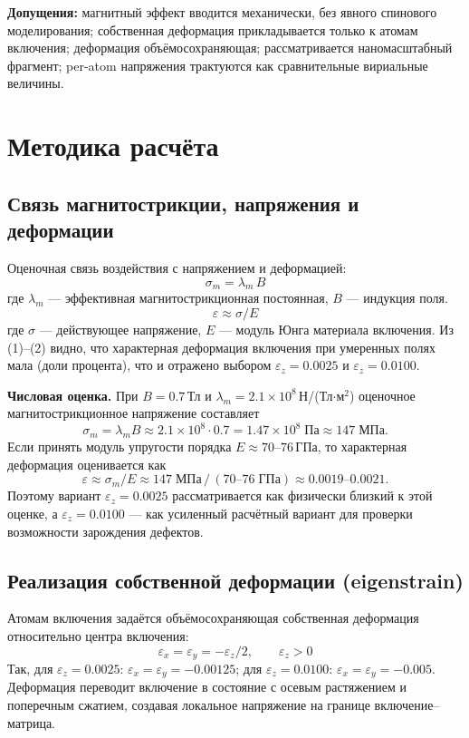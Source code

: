 \documentclass[14pt,a4paper]{extarticle}
\begin{document}
\textbf{Допущения:} магнитный эффект вводится механически, без явного спинового моделирования; собственная деформация прикладывается только к атомам включения; деформация объёмосохраняющая; рассматривается наномасштабный фрагмент; per-atom напряжения трактуются как сравнительные вириальные величины.

\section{Методика расчёта}
\subsection{Связь магнитострикции, напряжения и деформации}
Оценочная связь воздействия с напряжением и деформацией:
\begin{equation}
\sigma_m = \lambda_m \, B
\end{equation}
где $\lambda_m$ — эффективная магнитострикционная постоянная, $B$ — индукция поля.
\begin{equation}
\varepsilon \approx \sigma / E
\end{equation}
где $\sigma$ — действующее напряжение, $E$ — модуль Юнга материала включения. Из (1)–(2) видно, что характерная деформация включения при умеренных полях мала (доли процента), что и отражено выбором $\varepsilon_z = 0.0025$ и $\varepsilon_z = 0.0100$.

\textbf{Числовая оценка.} При $B = 0.7$\,Тл и $\lambda_m = 2.1\times10^{8}$\,Н/(Тл$\cdot$м$^2$) оценочное магнитострикционное напряжение составляет
\begin{equation}
\sigma_m = \lambda_m B \approx 2.1\times10^{8}\cdot 0.7 = 1.47\times10^{8}\;\text{Па} \approx 147\;\text{МПа}.
\end{equation}
Если принять модуль упругости порядка $E \approx 70$--$76$\,ГПа, то характерная деформация оценивается как
\begin{equation}
\varepsilon \approx \sigma_m / E \approx 147\;\text{МПа} \,/\, (70\text{--}76\;\text{ГПа}) \approx 0.0019\text{--}0.0021.
\end{equation}
Поэтому вариант $\varepsilon_z = 0.0025$ рассматривается как физически близкий к этой оценке, а $\varepsilon_z = 0.0100$ — как усиленный расчётный вариант для проверки возможности зарождения дефектов.

\subsection{Реализация собственной деформации (eigenstrain)}
Атомам включения задаётся объёмосохраняющая собственная деформация относительно центра включения:
\begin{equation}
\varepsilon_x = \varepsilon_y = -\varepsilon_z/2, \qquad \varepsilon_z > 0
\end{equation}
Так, для $\varepsilon_z = 0.0025$: $\varepsilon_x = \varepsilon_y = -0.00125$; для $\varepsilon_z = 0.0100$: $\varepsilon_x = \varepsilon_y = -0.005$. Деформация переводит включение в состояние с осевым растяжением и поперечным сжатием, создавая локальное напряжение на границе включение–матрица.
\end{document}
